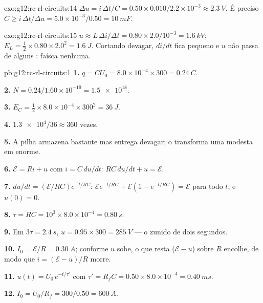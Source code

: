 \begin{solution}{exo:g12:rc-rl-circuits:14}
$\Delta u = i\,\Delta t/C = 0.50 \times 0.010/2.2\times10^{-3} \approx
\qty{2.3}{V}$. É preciso $C \geq i\,\Delta t/\Delta u =
5.0\times10^{-3}/0.50 = \qty{10}{mF}$.
\end{solution}

\begin{solution}{exo:g12:rc-rl-circuits:15}
$u \approx L\,\Delta i/\Delta t = 0.80 \times 2.0/10^{-3} =
\qty{1.6}{kV}$; $E_L = \tfrac12 \times 0.80 \times 2.0^2 =
\qty{1.6}{J}$. Cortando devagar, $di/dt$ fica pequeno e $u$ não passa de
alguns : faísca nenhuma.
\end{solution}

\begin{solution}{pb:g12:rc-rl-circuits:1}
\textbf{1.} $q = CU_0 = 8.0\times10^{-4} \times 300 = \qty{0.24}{C}$.

\textbf{2.} $N = 0.24/1.60\times10^{-19} = \num{1.5e18}$.

\textbf{3.} $E_C = \tfrac12 \times 8.0\times10^{-4} \times 300^2 =
\qty{36}{J}$.

\textbf{4.} $\num{1.3e4}/36 \approx 360$ vezes.

\textbf{5.} A pilha armazena bastante mas entrega devagar; o 
transforma uma  modesta em \emph{} enorme.

\textbf{6.} $\mathcal{E} = Ri + u$ com $i = C\,du/dt$:
$RC\,du/dt + u = \mathcal{E}$.

\textbf{7.} $du/dt = (\mathcal{E}/RC)e^{-t/RC}$:
$\mathcal{E}e^{-t/RC} + \mathcal{E}(1 - e^{-t/RC}) = \mathcal{E}$ para
todo $t$, e $u(0) = 0$.

\textbf{8.} $\tau = RC = 10^3 \times 8.0\times10^{-4} = \qty{0.80}{s}$.

\textbf{9.} Em $3\tau = \qty{2.4}{s}$, $u = 0.95 \times 300 =
\qty{285}{V}$ --- o zunido de dois segundos.

\textbf{10.} $I_0 = \mathcal{E}/R = \qty{0.30}{A}$; conforme $u$ sobe, o
que resta ($\mathcal{E} - u$) sobre $R$ encolhe, de modo que
$i = (\mathcal{E}-u)/R$ morre.

\textbf{11.} $u(t) = U_0\,e^{-t/\tau'}$ com
$\tau' = R_f C = 0.50 \times 8.0\times10^{-4} = \qty{0.40}{ms}$.

\textbf{12.} $I_0 = U_0/R_f = 300/0.50 = \qty{600}{A}$.


\end{solution}
